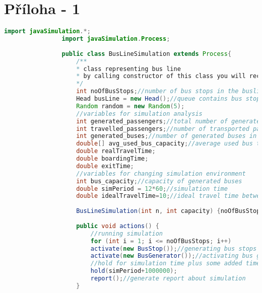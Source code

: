 \documentclass{article}
\begin{document}
	\section{Příloha - 1}\label{priloha1}
			\begin{lstlisting}[language=java]
				import javaSimulation.*;
				import javaSimulation.Process;
				
				public class BusLineSimulation extends Process{
					/**
					* class representing bus line
					* by calling constructor of this class you will receive data related to your parameters
					*/
					int noOfBusStops;//number of bus stops in the busline
					Head busLine = new Head();//queue contains bus stops
					Random random = new Random(5);
					//variables for simulation analysis
					int generated_passengers;//total number of generated passengers on busstops
					int travelled_passengers;//number of transported passengers
					int generated_buses;//number of generated buses in simulation time
					double[] avg_used_bus_capacity;//average used bus transport capacity between bus stops
					double realTravelTime;
					double boardingTime;
					double exitTime;
					//variables for changing simulation environment
					int bus_capacity;//capacity of generated buses
					double simPeriod = 12*60;//simulation time
					double idealTravelTime=10;//ideal travel time between two bus stops
					
					BusLineSimulation(int n, int capacity) {noOfBusStops = n;avg_used_bus_capacity = new double[n];bus_capacity=capacity;}
					
					public void actions() {
						//running simulation
						for (int i = 1; i <= noOfBusStops; i++)
						activate(new BusStop());//generating bus stops based on given parameter
						activate(new BusGenerator());//activating bus generator
						//hold for simulation time plus some added time to let simulation finish it work
						hold(simPeriod+1000000);
						report();//generate report about simulation
					}
					

\end{lstlisting}
\end{document}
